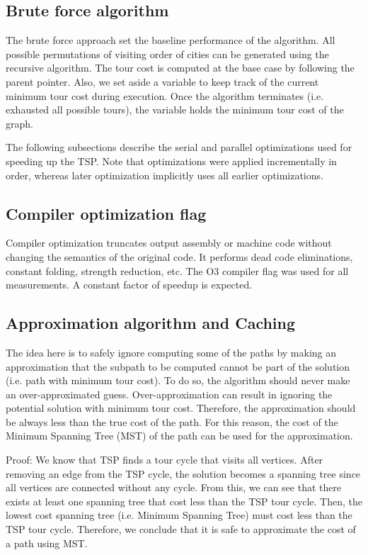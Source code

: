 \documentclass[conference]{IEEEtran}
\begin{document}
\subsection{Brute force algorithm}
The brute force approach set the baseline performance of the algorithm. All possible permutations of visiting order of cities can be generated using the recursive algorithm.  
The tour cost is computed at the base case by following the parent pointer. Also, we set aside a variable to keep track of the current minimum tour cost during execution. Once the algorithm terminates (i.e. exhausted all possible tours), the variable holds the minimum tour cost of the graph. 


The following subsections describe the serial and parallel optimizations used for speeding up the TSP. Note that optimizations were applied incrementally in order, whereas later optimization implicitly uses all earlier optimizations. 

\subsection{Compiler optimization flag}

Compiler optimization truncates output assembly or machine code without changing the semantics of the original code. It performs dead code eliminations, constant folding, strength reduction, etc. The O3 compiler flag was used for all measurements. A constant factor of speedup is expected.

\subsection{Approximation algorithm and Caching}

The idea here is to safely ignore computing some of the paths by making an approximation that the subpath to be computed cannot be part of the solution (i.e. path with minimum tour cost). To do so, the algorithm should never make an over-approximated guess. Over-approximation can result in ignoring the potential solution with minimum tour cost. Therefore, the approximation should be always less than the true cost of the path. For this reason, the cost of the Minimum Spanning Tree (MST) of the path can be used for the approximation.

Proof:
We know that TSP finds a tour cycle that visits all vertices. After removing an edge from the TSP cycle, the solution becomes a spanning tree since all vertices are connected without any cycle. From this, we can see that there exists at least one spanning tree that cost less than the TSP tour cycle. Then, the lowest cost spanning tree (i.e. Minimum Spanning Tree) must cost less than the TSP tour cycle. Therefore, we conclude that it is safe to approximate the cost of a path using MST.
\end{document}
